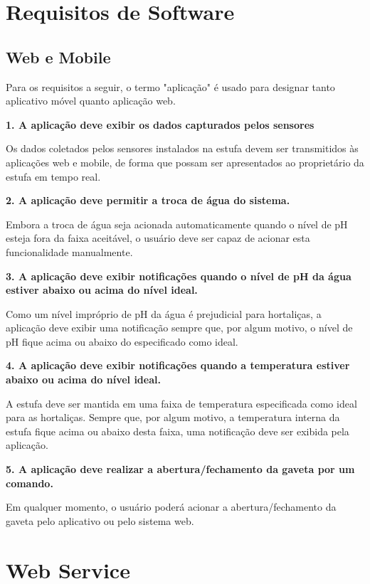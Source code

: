 \section{Requisitos de Software}

\subsection{Web e Mobile}

Para os requisitos a seguir, o termo "aplicação" é usado para designar tanto aplicativo móvel quanto aplicação web.

\textbf{1. A aplicação deve exibir os dados capturados pelos sensores}

Os dados coletados pelos sensores instalados na estufa devem ser transmitidos às aplicações web e mobile, de forma que possam ser apresentados ao proprietário da estufa em tempo real.


\textbf{2. A aplicação deve permitir a troca de água do sistema.}

Embora a troca de água seja acionada automaticamente quando o nível de pH esteja fora da faixa aceitável, o usuário deve ser capaz de acionar esta funcionalidade manualmente.

\textbf{3. A aplicação deve exibir notificações quando o nível de pH da água estiver abaixo ou acima do nível ideal.}

Como um nível impróprio de pH da água é prejudicial para hortaliças, a aplicação deve exibir uma notificação sempre que, por algum motivo, o nível de pH fique acima ou abaixo do especificado como ideal. 

\textbf{4. A aplicação deve exibir notificações quando a temperatura estiver abaixo ou acima do nível ideal.}

A estufa deve ser mantida em uma faixa de temperatura especificada como ideal para as hortaliças. Sempre que, por algum motivo, a temperatura interna da estufa fique acima ou abaixo desta faixa, uma notificação deve ser exibida pela aplicação.

\textbf{5. A aplicação deve realizar a abertura/fechamento da gaveta por um comando.}

Em qualquer momento, o usuário poderá acionar a abertura/fechamento da gaveta pelo aplicativo ou pelo sistema web.


\section{Web Service}

